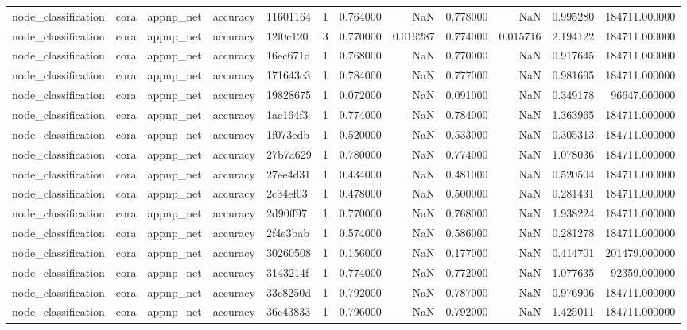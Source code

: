 \begin{tabular}{lllllrrrrrrr}
node_classification & cora & appnp_net & accuracy & 11601164 & 1 & 0.764000 & NaN & 0.778000 & NaN & 0.995280 & 184711.000000 \\
node_classification & cora & appnp_net & accuracy & 12f0c120 & 3 & 0.770000 & 0.019287 & 0.774000 & 0.015716 & 2.194122 & 184711.000000 \\
node_classification & cora & appnp_net & accuracy & 16ec671d & 1 & 0.768000 & NaN & 0.770000 & NaN & 0.917645 & 184711.000000 \\
node_classification & cora & appnp_net & accuracy & 171643c3 & 1 & 0.784000 & NaN & 0.777000 & NaN & 0.981695 & 184711.000000 \\
node_classification & cora & appnp_net & accuracy & 19828675 & 1 & 0.072000 & NaN & 0.091000 & NaN & 0.349178 & 96647.000000 \\
node_classification & cora & appnp_net & accuracy & 1ac164f3 & 1 & 0.774000 & NaN & 0.784000 & NaN & 1.363965 & 184711.000000 \\
node_classification & cora & appnp_net & accuracy & 1f073edb & 1 & 0.520000 & NaN & 0.533000 & NaN & 0.305313 & 184711.000000 \\
node_classification & cora & appnp_net & accuracy & 27b7a629 & 1 & 0.780000 & NaN & 0.774000 & NaN & 1.078036 & 184711.000000 \\
node_classification & cora & appnp_net & accuracy & 27ee4d31 & 1 & 0.434000 & NaN & 0.481000 & NaN & 0.520504 & 184711.000000 \\
node_classification & cora & appnp_net & accuracy & 2c34ef03 & 1 & 0.478000 & NaN & 0.500000 & NaN & 0.281431 & 184711.000000 \\
node_classification & cora & appnp_net & accuracy & 2d90ff97 & 1 & 0.770000 & NaN & 0.768000 & NaN & 1.938224 & 184711.000000 \\
node_classification & cora & appnp_net & accuracy & 2f4e3bab & 1 & 0.574000 & NaN & 0.586000 & NaN & 0.281278 & 184711.000000 \\
node_classification & cora & appnp_net & accuracy & 30260508 & 1 & 0.156000 & NaN & 0.177000 & NaN & 0.414701 & 201479.000000 \\
node_classification & cora & appnp_net & accuracy & 3143214f & 1 & 0.774000 & NaN & 0.772000 & NaN & 1.077635 & 92359.000000 \\
node_classification & cora & appnp_net & accuracy & 33c8250d & 1 & 0.792000 & NaN & 0.787000 & NaN & 0.976906 & 184711.000000 \\
node_classification & cora & appnp_net & accuracy & 36c43833 & 1 & 0.796000 & NaN & 0.792000 & NaN & 1.425011 & 184711.000000 \\

\end{tabular}
